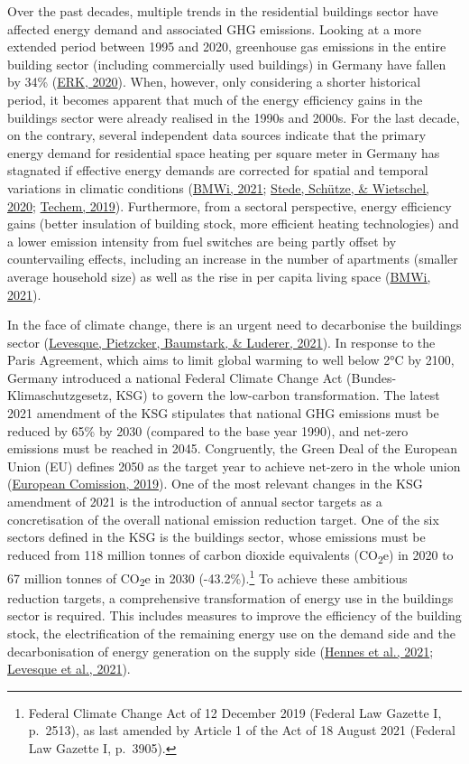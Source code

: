 \documentclass[12pt,twoside]{reedthesis}
\begin{document}
Over the past decades, multiple trends in the residential buildings sector have affected energy demand and associated GHG emissions. Looking at a more extended period between 1995 and 2020, greenhouse gas emissions in the entire building sector (including commercially used buildings) in Germany have fallen by 34\% (\protect\hyperlink{ref-erk20}{ERK, 2020}). When, however, only considering a shorter historical period, it becomes apparent that much of the energy efficiency gains in the buildings sector were already realised in the 1990s and 2000s. For the last decade, on the contrary, several independent data sources indicate that the primary energy demand for residential space heating per square meter in Germany has stagnated if effective energy demands are corrected for spatial and temporal variations in climatic conditions (\protect\hyperlink{ref-bmwi21}{BMWi, 2021}; \protect\hyperlink{ref-stede_etal20}{Stede, Schütze, \& Wietschel, 2020}; \protect\hyperlink{ref-techem19}{Techem, 2019}). Furthermore, from a sectoral perspective, energy efficiency gains (better insulation of building stock, more efficient heating technologies) and a lower emission intensity from fuel switches are being partly offset by countervailing effects, including an increase in the number of apartments (smaller average household size) as well as the rise in per capita living space (\protect\hyperlink{ref-bmwi21}{BMWi, 2021}).

In the face of climate change, there is an urgent need to decarbonise the buildings sector (\protect\hyperlink{ref-levesque_etal21}{Levesque, Pietzcker, Baumstark, \& Luderer, 2021}). In response to the Paris Agreement, which aims to limit global warming to well below 2°C by 2100, Germany introduced a national Federal Climate Change Act (Bundes-Klimaschutzgesetz, KSG) to govern the low-carbon transformation. The latest 2021 amendment of the KSG stipulates that national GHG emissions must be reduced by 65\% by 2030 (compared to the base year 1990), and net-zero emissions must be reached in 2045. Congruently, the Green Deal of the European Union (EU) defines 2050 as the target year to achieve net-zero in the whole union (\protect\hyperlink{ref-europeancomission19}{European Comission, 2019}). One of the most relevant changes in the KSG amendment of 2021 is the introduction of annual sector targets as a concretisation of the overall national emission reduction target. One of the six sectors defined in the KSG is the buildings sector, whose emissions must be reduced from 118 million tonnes of carbon dioxide equivalents (CO\textsubscript{2}e) in 2020 to 67 million tonnes of CO\textsubscript{2}e in 2030 (-43.2\%).\footnote{Federal Climate Change Act of 12 December 2019 (Federal Law Gazette I, p.~2513), as last amended by Article 1 of the Act of 18 August 2021 (Federal Law Gazette I, p.~3905).} To achieve these ambitious reduction targets, a comprehensive transformation of energy use in the buildings sector is required. This includes measures to improve the efficiency of the building stock, the electrification of the remaining energy use on the demand side and the decarbonisation of energy generation on the supply side (\protect\hyperlink{ref-hennes_etal21}{Hennes et al., 2021}; \protect\hyperlink{ref-levesque_etal21}{Levesque et al., 2021}).
\end{document}
